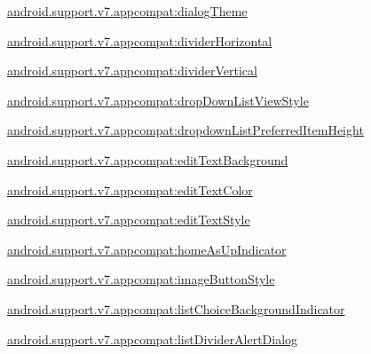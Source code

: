 {\ttfamily \hyperlink{classandroid_1_1support_1_1v7_1_1appcompat_1_1R_1_1styleable_a3b373a5641c2c0d185832eeac15143ef}{android.\+support.\+v7.\+appcompat\+:dialog\+Theme}}

{\ttfamily \hyperlink{classandroid_1_1support_1_1v7_1_1appcompat_1_1R_1_1styleable_a9f9eeb41cd04fde184cb1d33ff02ac4c}{android.\+support.\+v7.\+appcompat\+:divider\+Horizontal}}

{\ttfamily \hyperlink{classandroid_1_1support_1_1v7_1_1appcompat_1_1R_1_1styleable_a0229bd53423fdcafebbee737780714c3}{android.\+support.\+v7.\+appcompat\+:divider\+Vertical}}

{\ttfamily \hyperlink{classandroid_1_1support_1_1v7_1_1appcompat_1_1R_1_1styleable_a3da6d88b52409300bd0e52cd51d23b95}{android.\+support.\+v7.\+appcompat\+:drop\+Down\+List\+View\+Style}}

{\ttfamily \hyperlink{classandroid_1_1support_1_1v7_1_1appcompat_1_1R_1_1styleable_a64633ebcc361abc4bc0d98ec47d2ec0e}{android.\+support.\+v7.\+appcompat\+:dropdown\+List\+Preferred\+Item\+Height}}

{\ttfamily \hyperlink{classandroid_1_1support_1_1v7_1_1appcompat_1_1R_1_1styleable_afc8d2168bda3ebfc16b4e27ccdad5f98}{android.\+support.\+v7.\+appcompat\+:edit\+Text\+Background}}

{\ttfamily \hyperlink{classandroid_1_1support_1_1v7_1_1appcompat_1_1R_1_1styleable_a1e1c82a944abb501f53097bce7f50f0b}{android.\+support.\+v7.\+appcompat\+:edit\+Text\+Color}}

{\ttfamily \hyperlink{classandroid_1_1support_1_1v7_1_1appcompat_1_1R_1_1styleable_a61b6fb421253f208b594379481457a10}{android.\+support.\+v7.\+appcompat\+:edit\+Text\+Style}}

{\ttfamily \hyperlink{classandroid_1_1support_1_1v7_1_1appcompat_1_1R_1_1styleable_a64e8a50c8e529ef52de9d6160eec4331}{android.\+support.\+v7.\+appcompat\+:home\+As\+Up\+Indicator}}

{\ttfamily \hyperlink{classandroid_1_1support_1_1v7_1_1appcompat_1_1R_1_1styleable_a0af1c0cbacd91d7d7139ddfaf38325f6}{android.\+support.\+v7.\+appcompat\+:image\+Button\+Style}}

{\ttfamily \hyperlink{classandroid_1_1support_1_1v7_1_1appcompat_1_1R_1_1styleable_a099705a7173bf4f42f97f179e7b70d69}{android.\+support.\+v7.\+appcompat\+:list\+Choice\+Background\+Indicator}}

{\ttfamily \hyperlink{classandroid_1_1support_1_1v7_1_1appcompat_1_1R_1_1styleable_a7a821c50df10592a0cbb6633ce4d89b2}{android.\+support.\+v7.\+appcompat\+:list\+Divider\+Alert\+Dialog}}

